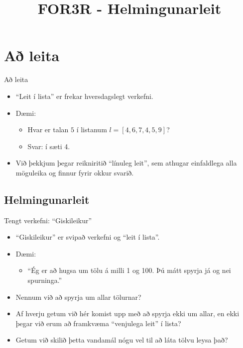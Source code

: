\documentclass{beamer}
\title{FOR3R - Helmingunarleit}
\begin{document}
\begin{frame}
\titlepage
\end{frame}

\section{Að leita}

\begin{frame}{Að leita}
\begin{itemize}
 \item ``Leit í lista'' er frekar hversdagslegt verkefni.
 \item Dæmi:
 \begin{itemize}
  \item Hvar er talan $5$ í listanum $l = [4, 6, 7, 4, 5, 9]$?
  \item Svar: í sæti 4.
 \end{itemize}
 \item Við þekkjum þegar reikniritið ``línuleg leit'', sem athugar einfaldlega alla möguleika og finnur fyrir okkur svarið.
\end{itemize}
\end{frame}

\subsection{Helmingunarleit}

\begin{frame}{Tengt verkefni: ``Giskileikur''}
\begin{itemize}
 \item ``Giskileikur'' er svipað verkefni og ``leit í lista''. 
 \item Dæmi:
 \begin{itemize}
  \item ``Ég er að hugsa um tölu á milli 1 og 100. Þú mátt spyrja já og nei spurninga.''
 \end{itemize}
 \item Nennum við að spyrja um allar tölurnar?
 \pause
 \item Af hverju getum við hér komist upp með að spyrja ekki um allar, en ekki þegar við erum að framkvæma ``venjulega leit'' í lista?
 \pause
 \item Getum við skilið þetta vandamál nógu vel til að láta tölvu leysa það?
\end{itemize}
\end{frame}
\end{document}
